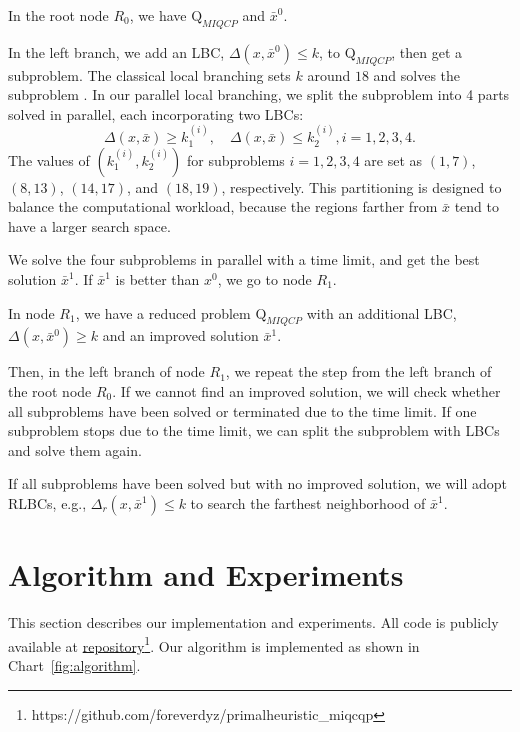 \documentclass[]{article}
\begin{document}
In the root node $R_0$, we have $\mathrm{Q}_{MIQCP}$ and $\bar{x}^0$.

In the left branch, we add an LBC, $\Delta(x, \bar{x}^0)\leq k$, to $\mathrm{Q}_{MIQCP}$, then get a subproblem. The classical local branching sets $k$ around $18$ and solves the subproblem \cite{fischetti2003local}. In our parallel local branching, we split the subproblem into 4 parts solved in parallel, each incorporating two LBCs:
\[
\Delta(x, \bar{x}) \geq k_1^{(i)}, \quad \Delta(x, \bar{x}) \leq k_2^{(i)}, i=1,2,3,4.
\]   
The values of $(k_1^{(i)}, k_2^{(i)})$ for subproblems $i = 1,2,3,4$ are set as $(1,7)$, $(8,13)$, $(14,17)$, and $(18,19)$, respectively. This partitioning is designed to balance the computational workload, because the regions farther from $\bar{x}$ tend to have a larger search space.

We solve the four subproblems in parallel with a time limit, and get the best solution $\bar{x}^1$. If $\bar{x}^1$ is better than $x^0$, we go to node $R_1$.

In node $R_1$, we have a reduced problem $\mathrm{Q}_{MIQCP}$ with an additional LBC,
$\Delta(x, \bar{x}^0)\geq k$ and an improved solution $\bar{x}^1$.

Then, in the left branch of node $R_1$, we repeat the step from the left branch of the root node $R_0$. If we cannot find an improved solution, we will check whether all subproblems have been solved or terminated due to the time limit. If one subproblem stops due to the time limit, we can split the subproblem with LBCs and solve them again. 

If all subproblems have been solved but with no improved solution, we will adopt RLBCs, e.g., $\Delta_r(x,\bar{x}^1)\leq k$ to search the farthest neighborhood of $\bar{x}^1$.

\section{Algorithm and Experiments}\label{sec:experiment}

This section describes our implementation and experiments.  All code is publicly available at \href{https://github.com/foreverdyz/primalheuristic\_miqcqp}{repository}\footnote{https://github.com/foreverdyz/primalheuristic\_miqcqp}. Our algorithm is implemented as shown in Chart~\ref{fig:algorithm}.
\end{document}
